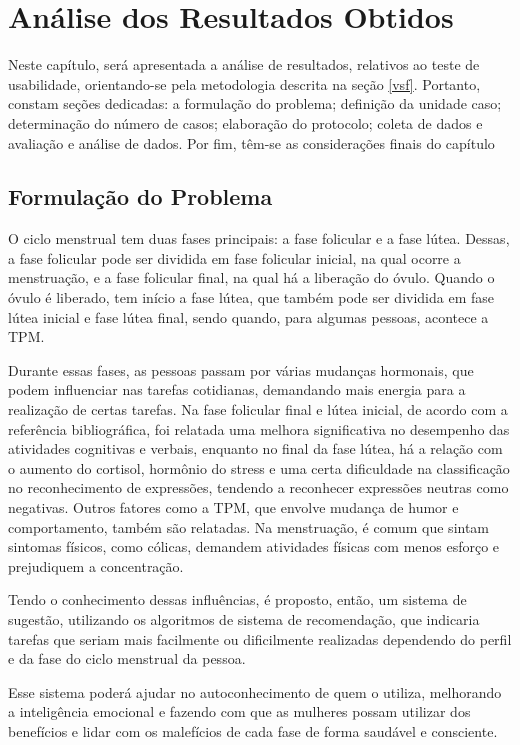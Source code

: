\chapter[Análise dos Resultados Obtidos]{Análise dos Resultados Obtidos}
\label{ch:capfinal}

Neste capítulo, será apresentada a análise de resultados, relativos ao teste de usabilidade, orientando-se pela metodologia 
descrita na seção \ref{vsf}. Portanto, constam seções dedicadas: a formulação do problema; definição da unidade 
caso; determinação do número de casos; elaboração do protocolo; coleta de dados e avaliação e análise de dados.
Por fim, têm-se as considerações finais do capítulo

\section{Formulação do Problema}
O ciclo menstrual tem duas fases principais: a fase folicular e a fase lútea. Dessas, a fase folicular 
pode 
ser dividida em fase folicular inicial, na qual ocorre a menstruação, e a fase folicular final, na qual 
há a liberação do óvulo.
Quando o óvulo é liberado, tem início a fase lútea, que também pode ser dividida em fase lútea inicial e 
fase lútea final, sendo quando, para algumas pessoas, acontece a TPM.

Durante essas fases, as pessoas passam por várias mudanças hormonais, que podem influenciar nas tarefas 
cotidianas, demandando mais energia para a realização de certas tarefas. Na fase folicular final e lútea inicial, de acordo com a referência bibliográfica, 
foi relatada uma melhora significativa no desempenho das atividades cognitivas e verbais, enquanto no final da fase 
lútea, há a relação com o aumento do cortisol, hormônio do stress e uma certa dificuldade na classificação 
no reconhecimento de expressões, tendendo a reconhecer expressões neutras como negativas. Outros fatores como a TPM, que envolve
mudança de humor e comportamento, também são relatadas. Na menstruação, é comum que sintam sintomas físicos, como cólicas, demandem 
atividades físicas com menos esforço e prejudiquem a concentração. 

Tendo o conhecimento dessas influências, é proposto, então, um sistema de sugestão, utilizando os algoritmos de sistema de recomendação, 
que indicaria tarefas que seriam mais facilmente ou dificilmente realizadas dependendo do perfil e da fase do ciclo menstrual da pessoa.

Esse sistema poderá ajudar no autoconhecimento de quem o utiliza, melhorando a inteligência emocional e fazendo com que 
as mulheres possam utilizar dos benefícios e lidar com os malefícios de cada fase de forma saudável e consciente.

